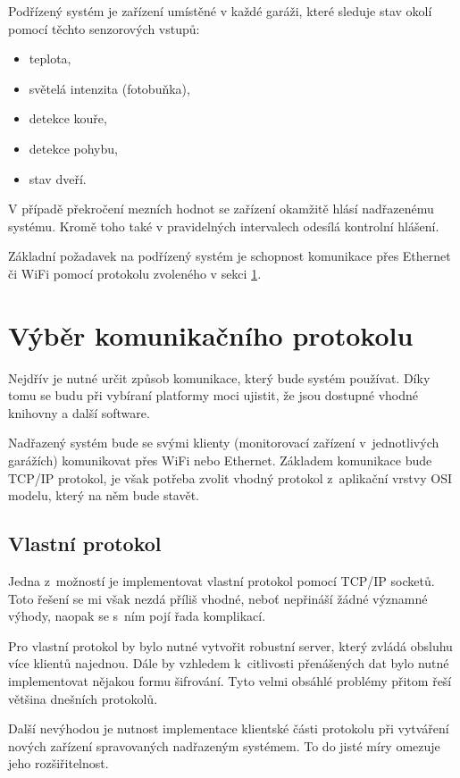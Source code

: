 Podřízený systém je zařízení umístěné v každé garáži, které sleduje stav okolí pomocí těchto senzorových vstupů:

\begin{itemize}
    \item teplota,
    \item světelá intenzita (fotobuňka),
    \item detekce kouře,
    \item detekce pohybu,
    \item stav dveří.
\end{itemize}

V případě překročení mezních hodnot se zařízení okamžitě hlásí nadřazenému systému. Kromě toho také v pravidelných intervalech odesílá kontrolní hlášení.

Základní požadavek na podřízený systém je schopnost komunikace přes Ethernet či WiFi pomocí protokolu zvoleného v sekci \ref{sec:an_protocol}.

\section{Výběr komunikačního protokolu}
\label{sec:an_protocol}

Nejdřív je nutné určit způsob komunikace, který bude systém používat. Díky tomu se budu při vybíraní platformy moci ujistit, že jsou dostupné vhodné knihovny a další software. 

Nadřazený systém bude se svými klienty (monitorovací zařízení v~jednotlivých garážích) komunikovat přes WiFi nebo Ethernet. Základem komunikace bude TCP/IP protokol, je však potřeba zvolit vhodný protokol z~aplikační vrstvy OSI modelu, který na něm bude stavět.

\subsection{Vlastní protokol}

Jedna z~možností je implementovat vlastní protokol pomocí TCP/IP socketů. Toto řešení se mi však nezdá příliš vhodné, neboť nepřináší žádné významné výhody, naopak se s~ním pojí řada komplikací.

Pro vlastní protokol by bylo nutné vytvořit robustní server, který zvládá obsluhu více klientů najednou. Dále by vzhledem k~citlivosti přenášených dat bylo nutné implementovat nějakou formu šifrování. Tyto velmi obsáhlé problémy přitom řeší většina dnešních protokolů.

Další nevýhodou je nutnost implementace klientské části protokolu při vytváření nových zařízení spravovaných nadřazeným systémem. To do jisté míry omezuje jeho rozšiřitelnost.

